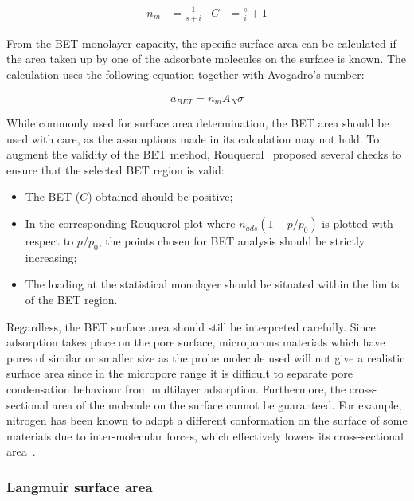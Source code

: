 \begin{align}
	n_{m} & = \frac{1}{s+i} & C & = \frac{s}{i} + 1
\end{align}

From the BET monolayer capacity, the specific surface area can be
calculated if the area taken up by one of the adsorbate molecules
on the surface is known. The calculation uses the following equation
together with Avogadro's number:

\begin{equation}
	a_{BET} = n_m A_N \sigma
\end{equation}

While commonly used for surface area determination, the BET area
should be used with care, as the assumptions made in
its calculation may not hold. To augment the validity of the BET
method, Rouquerol~\cite{rouquerolAdsorptionPowdersPorous2013} proposed
several checks to ensure that the selected BET region is valid:

\begin{itemize}

	\item The BET (\(C\)) obtained should be positive;
	\item In the corresponding Rouquerol plot where \(n_{ads}(1-p/p_0)\)
	      is plotted with respect to \(p/p_0\), the points chosen for BET
	      analysis should be strictly increasing;
	\item The loading at the statistical monolayer should be
	      situated within the limits of the BET region.

\end{itemize}

Regardless, the BET surface area should still be interpreted carefully.
Since adsorption takes place on the pore surface, microporous materials
which have pores of similar or smaller size as the probe molecule used
will not give a realistic surface area since in the micropore range
it is difficult to separate pore condensation behaviour from
multilayer adsorption. Furthermore, the cross-sectional
area of the molecule on the surface cannot be guaranteed. For example,
nitrogen has been known to adopt a different conformation on the surface
of some materials due to inter-molecular forces, which effectively
lowers its cross-sectional area~\cite{rouquerolAdsorptionPowdersPorous2013}.

\subsubsection{Langmuir surface area}\label{pyg:charac:langmuirarea}

